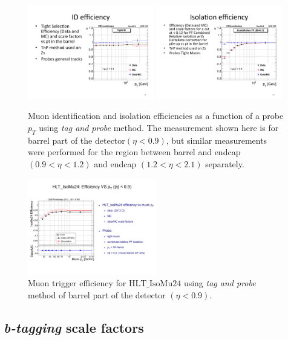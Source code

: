 \begin{figure}[htbp]
	\centering
		\includegraphics[width=0.49\textwidth]{Figures/ID_eff.pdf}
		\includegraphics[width=0.49\textwidth]{Figures/ISO_eff.pdf}
	\caption[Muon identification and isolation efficiencies using \textit{tag and probe} method.]{Muon identification and isolation efficiencies as a function of a probe $p_T$ using \textit{tag and probe} method. The measurement shown here is for barrel part of the detector$(\eta<0.9)$, but similar measurements were performed for the region between barrel and endcap$(0.9<\eta<1.2)$ and endcap $(1.2<\eta<2.1)$ separately.}
	\label{fig:eff_IDISO}
\end{figure}

\begin{figure}[htbp]
	\centering
		\includegraphics[width=0.5\textwidth]{Figures/trig_eff.pdf}
	\caption[Muon trigger efficiency using \textit{tag and probe} method.]{Muon trigger efficiency for $\mathrm{HLT\_IsoMu24}$ using \textit{tag and probe} method of barrel part of the detector $(\eta<0.9)$.}
	\label{fig:eff_trig}
\end{figure}  



\subsection{\textit{b-tagging} scale factors}

